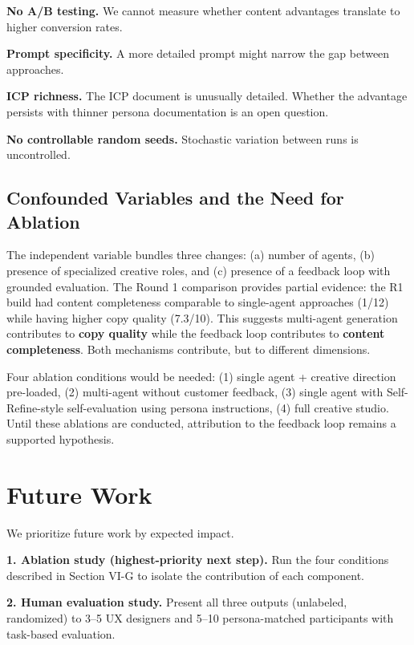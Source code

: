 \documentclass[conference]{IEEEtran}
\begin{document}
\textbf{No A/B testing.} We cannot measure whether content advantages translate to higher conversion rates.

\textbf{Prompt specificity.} A more detailed prompt might narrow the gap between approaches.

\textbf{ICP richness.} The ICP document is unusually detailed. Whether the advantage persists with thinner persona documentation is an open question.

\textbf{No controllable random seeds.} Stochastic variation between runs is uncontrolled.

\subsection{Confounded Variables and the Need for Ablation}\label{confounded-variables-and-the-need-for-ablation}

The independent variable bundles three changes: (a) number of agents, (b) presence of specialized creative roles, and (c) presence of a feedback loop with grounded evaluation. The Round 1 comparison provides partial evidence: the R1 build had content completeness comparable to single-agent approaches (1/12) while having higher copy quality (7.3/10). This suggests multi-agent generation contributes to \textbf{copy quality} while the feedback loop contributes to \textbf{content completeness}. Both mechanisms contribute, but to different dimensions.

Four ablation conditions would be needed: (1) single agent + creative direction pre-loaded, (2) multi-agent without customer feedback, (3) single agent with Self-Refine-style self-evaluation using persona instructions, (4) full creative studio. Until these ablations are conducted, attribution to the feedback loop remains a supported hypothesis.

\section{Future Work}\label{future-work}

We prioritize future work by expected impact.

\textbf{1. Ablation study (highest-priority next step).} Run the four conditions described in Section VI-G to isolate the contribution of each component.

\textbf{2. Human evaluation study.} Present all three outputs (unlabeled, randomized) to 3--5 UX designers and 5--10 persona-matched participants with task-based evaluation.
\end{document}
